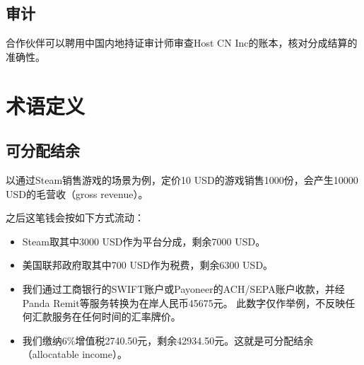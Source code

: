 \documentclass[a4paper,12pt]{report}
\begin{document}
\section{审计}
合作伙伴可以聘用中国内地持证审计师审查Host CN Inc的账本，核对分成结算的准确性。

















\chapter{术语定义}

\section{可分配结余}
以通过Steam销售游戏的场景为例，定价10 USD的游戏销售1000份，会产生10000 USD的毛营收（gross revenue）。

之后这笔钱会按如下方式流动：

\begin{itemize}
	\item Steam取其中3000 USD作为平台分成，剩余7000 USD。
	\item 美国联邦政府取其中700 USD作为税费，剩余6300 USD。
	\item 我们通过工商银行的SWIFT账户或Payoneer的ACH/SEPA账户收款，并经Panda Remit等服务转换为在岸人民币45675元。
	      此数字仅作举例，不反映任何汇款服务在任何时间的汇率牌价。
    \item 我们缴纳6\%增值税2740.50元，剩余42934.50元。这就是可分配结余（allocatable income）。
\end{itemize}
















\end{document}
